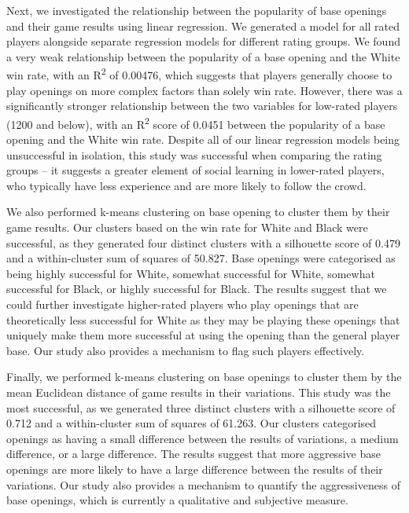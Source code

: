 \documentclass[a4paper, 11pt]{article}
\begin{document}
Next, we investigated the relationship between the popularity of base openings and their game results using linear regression. We generated a model for all rated players alongside separate regression models for different rating groups. We found a very weak relationship between the popularity of a base opening and the White win rate, with an R\textsuperscript{2} of 0.00476, which suggests that players generally choose to play openings on more complex factors than solely win rate. However, there was a significantly stronger relationship between the two variables for low-rated players (1200 and below), with an R\textsuperscript{2} score of 0.0451 between the popularity of a base opening and the White win rate. Despite all of our linear regression models being unsuccessful in isolation, this study was successful when comparing the rating groups -- it suggests a greater element of social learning in lower-rated players, who typically have less experience and are more likely to follow the crowd.

We also performed k-means clustering on base opening to cluster them by their game results. Our clusters based on the win rate for White and Black were successful, as they generated four distinct clusters with a silhouette score of 0.479 and a within-cluster sum of squares of 50.827. Base openings were categorised as being highly successful for White, somewhat successful for White, somewhat successful for Black, or highly successful for Black. The results suggest that we could further investigate higher-rated players who play openings that are theoretically less successful for White as they may be playing these openings that uniquely make them more successful at using the opening than the general player base. Our study also provides a mechanism to flag such players effectively.

Finally, we performed k-means clustering on base openings to cluster them by the mean Euclidean distance of game results in their variations. This study was the most successful, as we generated three distinct clusters with a silhouette score of 0.712 and a within-cluster sum of squares of 61.263. Our clusters categorised openings as having a small difference between the results of variations, a medium difference, or a large difference. The results suggest that more aggressive base openings are more likely to have a large difference between the results of their variations. Our study also provides a mechanism to quantify the aggressiveness of base openings, which is currently a qualitative and subjective measure.
\end{document}
